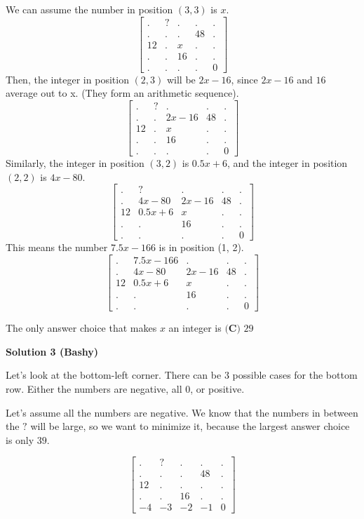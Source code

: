 \begin{enumerate}
We can assume the number in position $(3, 3)$ is $x$. 
 \[\begin{bmatrix} .&?&.&.&. \\ .&.&.&48&.\\ 12&.&x&.&.\\ .&.&16&.&.\\ .&.&.&.&0\end{bmatrix}\] Then, the integer in position $(2, 3)$ will be $2x-16$, since $2x-16$ and $16$ average out to x. (They form an arithmetic sequence).
 \[\begin{bmatrix} .&?&.&.&. \\ .&.&2x-16&48&.\\ 12&.&x&.&.\\ .&.&16&.&.\\ .&.&.&.&0\end{bmatrix}\]Similarly, the integer in position $(3, 2)$ is $0.5x+6$, and the integer in position $(2, 2)$ is $4x-80$. 
 \[\begin{bmatrix} .&?&.&.&. \\ .&4x-80&2x-16&48&.\\ 12&0.5x+6&x&.&.\\ .&.&16&.&.\\ .&.&.&.&0\end{bmatrix}\]This means the number $7.5x-166$ is in position (1, 2).
 \[\begin{bmatrix} .&7.5x-166&.&.&. \\ .&4x-80&2x-16&48&.\\ 12&0.5x+6&x&.&.\\ .&.&16&.&.\\ .&.&.&.&0\end{bmatrix}\]

 The only answer choice that makes $x$ an integer is $\boxed{\textbf{(C) }29}$




\textbf{Solution 3 (Bashy)}

Let's look at the bottom-left corner. There can be $3$ possible cases for the bottom row. Either the numbers are negative, all $0$, or positive. 

 Let's assume all the numbers are negative. We know that the numbers in between the $?$ will be large, so we want to minimize it, because the largest answer choice is only $39$.

 
 \[\begin{bmatrix} .&?&.&.&. \\ .&.&.&48&.\\ 12&.&.&.&.\\ .&.&16&.&.\\ -4&-3&-2&-1&0\end{bmatrix}\]


\end{enumerate}

